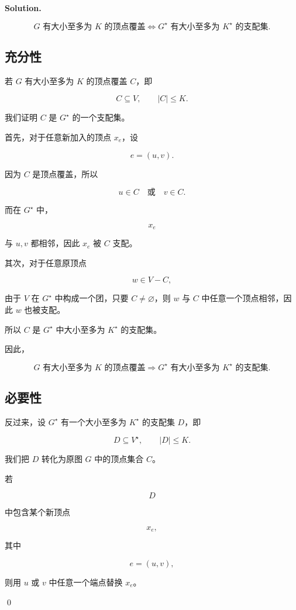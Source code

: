 \documentclass[11pt]{article}
\newenvironment{solution}{
\par\noindent\textbf{Solution.}\par\noindent
}{\qed}
\begin{document}
\begin{solution}
\[
G \text{ 有大小至多为 } K \text{ 的顶点覆盖}
\iff
G^\star \text{ 有大小至多为 } K^\star \text{ 的支配集}.
\]

\subsection*{充分性}

若 \(G\) 有大小至多为 \(K\) 的顶点覆盖 \(C\)，即

\[
C\subseteq V,\qquad |C|\leq K.
\]

我们证明 \(C\) 是 \(G^\star\) 的一个支配集。

首先，对于任意新加入的顶点 \(x_e\)，设

\[
e=(u,v).
\]

因为 \(C\) 是顶点覆盖，所以

\[
u\in C \quad \text{或} \quad v\in C.
\]

而在 \(G^\star\) 中，

\[
x_e
\]

与 \(u,v\) 都相邻，因此 \(x_e\) 被 \(C\) 支配。

其次，对于任意原顶点

\[
w\in V-C,
\]

由于 \(V\) 在 \(G^\star\) 中构成一个团，只要 \(C\neq \varnothing\)，则 \(w\) 与 \(C\) 中任意一个顶点相邻，因此 \(w\) 也被支配。

所以 \(C\) 是 \(G^\star\) 中大小至多为 \(K^\star\) 的支配集。

因此，

\[
G \text{ 有大小至多为 } K \text{ 的顶点覆盖}
\Rightarrow
G^\star \text{ 有大小至多为 } K^\star \text{ 的支配集}.
\]

\subsection*{必要性}

反过来，设 \(G^\star\) 有一个大小至多为 \(K^\star\) 的支配集 \(D\)，即

\[
D\subseteq V^\star,\qquad |D|\leq K.
\]

我们把 \(D\) 转化为原图 \(G\) 中的顶点集合 \(C\)。

若

\[
D
\]

中包含某个新顶点

\[
x_e,
\]

其中

\[
e=(u,v),
\]

则用 \(u\) 或 \(v\) 中任意一个端点替换 \(x_e\)。


\end{solution}
\end{document}
